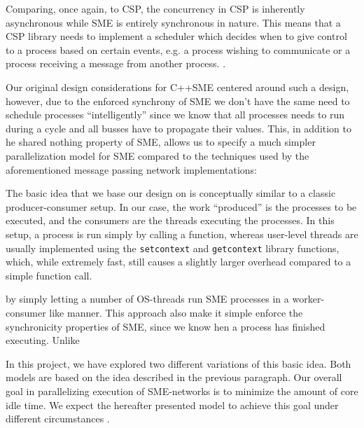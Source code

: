 Comparing, once again, to CSP, the concurrency in CSP is inherently
asynchronous while SME is entirely synchronous in nature. This means
that a CSP library needs to implement a scheduler which decides when
to give control to a process based on certain events, e.g. a process
wishing to communicate or a process receiving a message from another
process. .

Our original design considerations for C++SME centered around such a
design, however, due to the enforced synchrony of SME we don't have
the same need to schedule processes ``intelligently'' since we know
that all processes needs to run during a cycle and all busses have to
propagate their values. This, in addition to he shared nothing
property of SME, allows us to specify a much simpler parallelization
model for SME compared to the techniques used by the aforementioned
message passing network implementations:

The basic idea that we base our design on is conceptually similar to a
classic producer-consumer setup. In our case, the work ``produced'' is
the processes to be executed, and the consumers are the threads
executing the processes. In this setup, a process is run simply by
calling a function, whereas user-level threads are usually implemented
using the \texttt{setcontext} and \texttt{getcontext} library
functions, which, while extremely fast, still causes a slightly larger
overhead compared to a simple function call. 

by simply letting a number of OS-threads run SME processes in a
worker-consumer like manner. This approach also make it simple enforce
the synchronicity properties of SME, since we know hen a process has
finished executing. Unlike

In this project, we have explored two different variations of this
basic idea. Both models are based on the idea described in the
previous paragraph. Our overall goal in parallelizing execution of
SME-networks is to minimize the amount of core idle time. We expect
the hereafter presented model to achieve this goal under different
circumstances .





